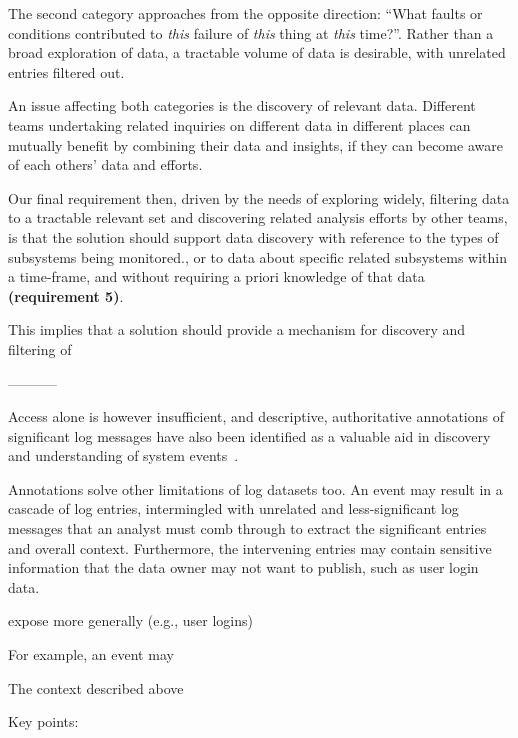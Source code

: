 The second category approaches from the opposite direction: ``What 
faults or conditions contributed to \emph{this} failure of \emph{this} 
thing at \emph{this} time?''. Rather than a broad exploration of data, 
a tractable volume of data is desirable, with unrelated entries 
filtered out. 

An issue affecting both categories is the discovery of relevant data. 
Different teams undertaking related inquiries on different data 
in different places can mutually benefit by combining their data and
insights, if they can become aware of each others' data and efforts. 

Our final requirement then, driven by the needs of exploring widely,
filtering data to a tractable relevant set and discovering related 
analysis efforts by other teams, is that the solution should support 
data discovery with reference to the types of subsystems being 
monitored., or to data about specific related subsystems within a
time-frame, and without requiring a priori knowledge of that data
\textbf{(requirement 5)}.



This implies that a solution should provide a mechanism for discovery
and filtering of 






-----------

Access alone is however insufficient, and 
descriptive, authoritative annotations of significant log messages
have also been identified as a valuable aid in discovery and
understanding of system events~\cite{CUG2016BoF}. 

Annotations solve other limitations of log datasets too. An event 
may result in a cascade of log entries, intermingled with unrelated 
and less-significant log messages that an analyst must comb through to 
extract the significant entries and overall context. Furthermore, 
the intervening entries may contain sensitive information that the data 
owner may not want to publish, such as user login data. 

expose more generally (e.g., user logins)

For example,
an event may 

The context described above 


Key points:

